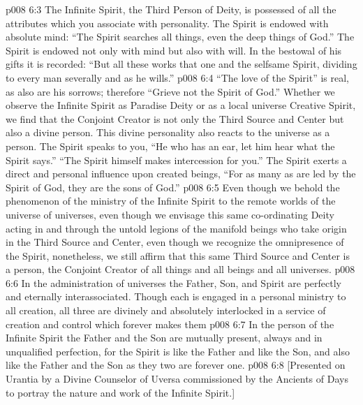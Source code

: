 \vs p008 6:3 The Infinite Spirit, the Third Person of Deity, is possessed of all the attributes which you associate with personality. The Spirit is endowed with absolute mind: “The Spirit searches all things, even the deep things of God.” The Spirit is endowed not only with mind but also with will. In the bestowal of his gifts it is recorded: “But all these works that one and the selfsame Spirit, dividing to every man severally and as he wills.”
\vs p008 6:4 “The love of the Spirit” is real, as also are his sorrows; therefore “Grieve not the Spirit of God.” Whether we observe the Infinite Spirit as Paradise Deity or as a local universe Creative Spirit, we find that the Conjoint Creator is not only the Third Source and Center but also a divine person. This divine personality also reacts to the universe as a person. The Spirit speaks to you, “He who has an ear, let him hear what the Spirit says.” “The Spirit himself makes intercession for you.” The Spirit exerts a direct and personal influence upon created beings, “For as many as are led by the Spirit of God, they are the sons of God.”
\vs p008 6:5 Even though we behold the phenomenon of the ministry of the Infinite Spirit to the remote worlds of the universe of universes, even though we envisage this same co\hyp{}ordinating Deity acting in and through the untold legions of the manifold beings who take origin in the Third Source and Center, even though we recognize the omnipresence of the Spirit, nonetheless, we still affirm that this same Third Source and Center is a person, the Conjoint Creator of all things and all beings and all universes.
\vs p008 6:6 \pc In the administration of universes the Father, Son, and Spirit are perfectly and eternally interassociated. Though each is engaged in a personal ministry to all creation, all three are divinely and absolutely interlocked in a service of creation and control which forever makes them 
\vs p008 6:7 In the person of the Infinite Spirit the Father and the Son are mutually present, always and in unqualified perfection, for the Spirit is like the Father and like the Son, and also like the Father and the Son as they two are forever one.
\vsetoff
\vs p008 6:8 [Presented on Urantia by a Divine Counselor of Uversa commissioned by the Ancients of Days to portray the nature and work of the Infinite Spirit.]
